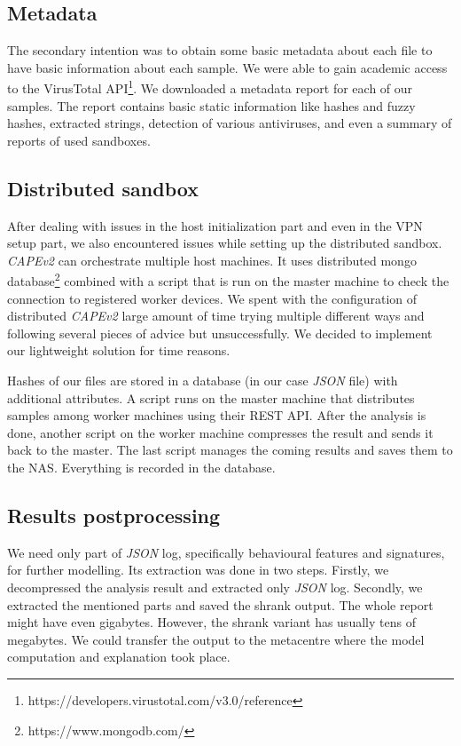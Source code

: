 \subsection{Metadata}
The secondary intention was to obtain some basic metadata about each file to have basic information about each sample. We were able to gain academic access to the VirusTotal API\footnote{https://developers.virustotal.com/v3.0/reference}. We downloaded a metadata report for each of our samples. The report contains basic static information like hashes and fuzzy hashes, extracted strings, detection of various antiviruses, and even a summary of reports of used sandboxes.

\subsection{Distributed sandbox}
After dealing with issues in the host initialization part and even in the VPN setup part, we also encountered issues while setting up the distributed sandbox. \emph{CAPEv2} can orchestrate multiple host machines. It uses distributed mongo database\footnote{https://www.mongodb.com/} combined with a script that is run on the master machine to check the connection to registered worker devices. We spent with the configuration of distributed \emph{CAPEv2} large amount of time trying multiple different ways and following several pieces of advice but unsuccessfully. We decided to implement our lightweight solution for time reasons.

Hashes of our files are stored in a database (in our case \emph{JSON} file) with additional attributes. A script runs on the master machine that distributes samples among worker machines using their REST API. After the analysis is done, another script on the worker machine compresses the result and sends it back to the master. The last script manages the coming results and saves them to the NAS. Everything is recorded in the database.

\subsection{Results postprocessing}
We need only part of \emph{JSON} log, specifically behavioural features and signatures, for further modelling. Its extraction was done in two steps. Firstly, we decompressed the analysis result and extracted only \emph{JSON} log. Secondly, we extracted the mentioned parts and saved the shrank output. The whole report might have even gigabytes. However, the shrank variant has usually tens of megabytes. We could transfer the output to the metacentre where the model computation and explanation took place.

